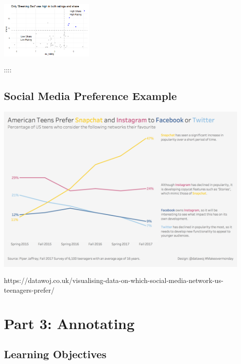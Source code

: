 \documentclass[
  letterpaper,
  DIV=11,
  numbers=noendperiod]{scrreprt}
\begin{document}
\includegraphics[width=1.82in,height=\textheight]{image/super-category.png}

::::

\section*{Social Media Preference
Example}\label{social-media-preference-example}


\includegraphics[width=5in,height=\textheight]{image/Colin.png}

https://datawoj.co.uk/visualising-data-on-which-social-media-network-us-teenagers-prefer/


\chapter*{Part 3: Annotating}\label{part-3-annotating}


\section*{Learning Objectives}\label{learning-objectives}
\end{document}
